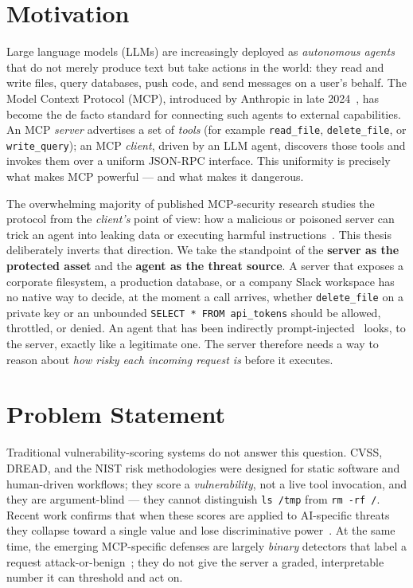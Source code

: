 \section{Motivation}
\label{sec:intro:motivation}

Large language models (LLMs) are increasingly deployed as \emph{autonomous
agents} that do not merely produce text but take actions in the world: they
read and write files, query databases, push code, and send messages on a
user's behalf. The Model Context Protocol (MCP), introduced by
Anthropic in late 2024~\cite{anthropic2024mcp}, has become the de facto
standard for connecting such agents to external capabilities. An MCP
\emph{server} advertises a set of \emph{tools} (for example
\texttt{read\_file}, \texttt{delete\_file}, or \texttt{write\_query}); an MCP
\emph{client}, driven by an LLM agent, discovers those tools and invokes them
over a uniform JSON-RPC interface. This uniformity is precisely what makes MCP
powerful --- and what makes it dangerous.

The overwhelming majority of published MCP-security research studies the
protocol from the \emph{client's} point of view: how a malicious or
poisoned server can trick an agent into leaking data or executing harmful
instructions~\cite{shi2025toolhijacker,jing2025mcip}. This thesis deliberately
inverts that direction. We take the standpoint of the \textbf{server as the
protected asset} and the \textbf{agent as the threat source}. A server that
exposes a corporate filesystem, a production database, or a company Slack
workspace has no native way to decide, at the moment a call arrives, whether
\texttt{delete\_file} on a private key or an unbounded
\texttt{SELECT * FROM api\_tokens} should be allowed, throttled, or denied. An
agent that has been indirectly prompt-injected~\cite{zhan2024injecagent,
debenedetti2024agentdojo} looks, to the server, exactly like a legitimate one.
The server therefore needs a way to reason about \emph{how risky each incoming
request is} before it executes.

\section{Problem Statement}
\label{sec:intro:problem}

Traditional vulnerability-scoring systems do not answer this question. CVSS,
DREAD, and the NIST risk methodologies were designed for static software and
human-driven workflows; they score a \emph{vulnerability}, not a live tool
invocation, and they are argument-blind --- they cannot distinguish
\texttt{ls /tmp} from \texttt{rm -rf /}. Recent work confirms that when these
scores are applied to AI-specific threats they collapse toward a single value
and lose discriminative power~\cite{bahar2024validity,spring2021time}. At the
same time, the emerging MCP-specific defenses are largely \emph{binary}
detectors that label a request attack-or-benign~\cite{xing2025mcpguard,
yang2025mcpsecbench}; they do not give the server a graded, interpretable
number it can threshold and act on.

